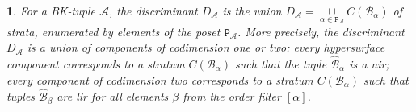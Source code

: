 \documentclass[11pt]{article}
\theoremstyle{plain}
\newtheorem{thm}{\protect\theoremname}[section]
\theoremstyle{definition}
\theoremstyle{remark}
\theoremstyle{plain}
\theoremstyle{plain}
\theoremstyle{plain}
\theoremstyle{definition}
\providecommand{\theoremname}{Theorem}
\begin{document}
\begin{thm}
\label{Theorem. Discriminant for a BK-tuple}For a BK-tuple $\mathscr{A}$,
the discriminant $D_{\mathscr{A}}$ is the union $D_{\mathscr{A}}=\underset{\alpha\in\mathtt{P}_{\mathscr{A}}}{\cup}C(\mathscr{B}_{\alpha})$
of strata, enumerated by elements of the poset $\mathtt{P}_{\mathscr{A}}$.
More precisely, the discriminant $D_{\mathscr{A}}$ is a union of
components of codimension one or two: every hypersurface component
corresponds to a stratum $C(\mathscr{B}_{\alpha})$ such that the
tuple $\hat{\mathscr{B}}_{\alpha}$ is a nir; every component of codimension
two corresponds to a stratum $C(\mathscr{B}_{\alpha})$ such that
tuples $\hat{\mathscr{B}}_{\beta}$ are lir for all elements $\beta$
from the order filter $[\alpha]$.
\end{thm}
\end{document}
